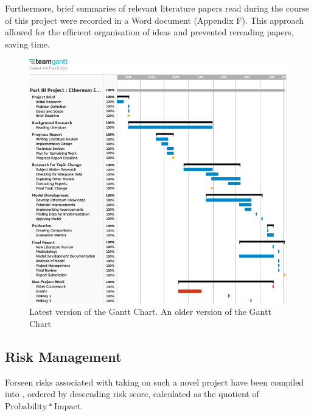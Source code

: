Furthermore, brief summaries of relevant literature papers read during the course of this project were recorded in a Word document (Appendix F). This approach allowed for the efficient organisation of ideas and prevented rereading papers, saving time. 


\begin{figure}[!htb]
    \includegraphics[width=14cm,center]{Figures/ganttUpdated.png}
    \caption{Latest version of the Gantt Chart. An older version of the Gantt Chart}
    \label{Figure:ganttUpdated}
\end{figure}



\subsection{Risk Management}

Forseen risks associated with taking on such a novel project have been compiled into , ordered by descending risk score, calculated as the quotient of $\mathrm{Probability * Impact}$.

